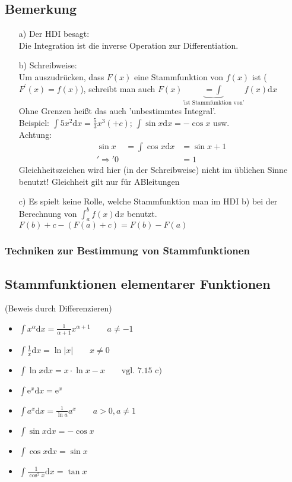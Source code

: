 \documentclass[12pt, titlepage]{article}
\newcommand{\e}{\textrm{e}}
\renewcommand{\>}{\rightarrow}
\renewcommand{\*}{\cdot}
\begin{document}
	\subsection{Bemerkung}
	\begin{itemize}
		\item[a)] Der HDI besagt:\\
		Die Integration ist die inverse Operation zur Differentiation.
		\item[b)] Schreibweise:\\
		Um auszudrücken, dass $F(x)$ eine Stammfunktion von $f(x)$ ist ($F^\prime(x)=f(x)$), schreibt man auch $F(x)\underbrace{=\int}_{\textrm{'ist Stammfunktion von'}}f(x)\textrm{d}x$\\
		Ohne Grenzen heißt das auch 'unbestimmtes Integral'.\\
		Beispiel: $\int5x^2\textrm{d}x=\frac{5}{3}x^3(+c)$; $\int\sin x\textrm{d}x=-\cos x$ usw.\\
		Achtung:
		\begin{align*}
			\sin x&=\int\cos x\textrm{d}x&=\sin x+1\\
			'\Rightarrow'0&&=1
		\end{align*}
	Gleichheitszeichen wird hier (in der Schreibweise) nicht im üblichen Sinne benutzt! Gleichheit gilt nur für ABleitungen
	\item[c)] Es spielt keine Rolle, welche Stammfunktion man im HDI b) bei der Berechnung von $\int_{a}^{b}f(x)\textrm{d}x$ benutzt.\\
	$F(b)+c-(F(a)+c)=F(b)-F(a)$
	\end{itemize}
	\subsubsection*{Techniken zur Bestimmung von Stammfunktionen}
	\subsection{Stammfunktionen elementarer Funktionen}
	(Beweis durch Differenzieren)
	\begin{itemize}
		\item $\int x^\alpha\textrm{d}x=\frac{1}{\alpha+1}x^{\alpha+1}\qquad a\neq -1$
		\item $\int\frac{1}{x}\textrm{d}x=\ln|x|\qquad x\neq 0$
		\item $\int\ln x\textrm{d}x=x\*\ln x-x\qquad\textrm{vgl. 7.15 c)}$
		\item $\int\e^x\textrm{d}x=\e^x$
		\item $\int a^x\textrm{d}x=\frac{1}{\ln a}a^x\qquad a>0,a\neq 1$
		\item $\int\sin x\textrm{d}x=-\cos x$
		\item $\int\cos x\textrm{d}x=\sin x$
		\item $\int\frac{1}{\cos^2x}\textrm{d}x=\tan x$
	\end{itemize}
\end{document}
